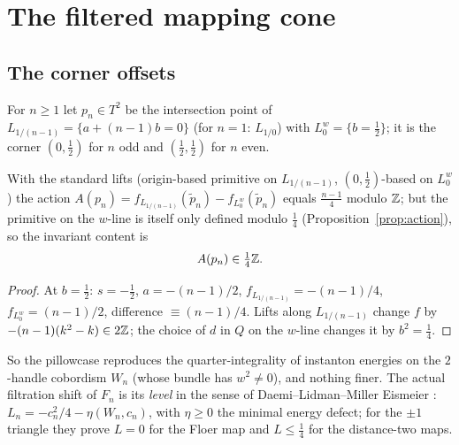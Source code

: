 \section{The filtered mapping cone}\label{sec:cone}
\subsection{The corner offsets}
For $n\ge1$ let $p_n\in T^2$ be the intersection point of $L_{1/(n-1)}=\{a+(n-1)b=0\}$ (for $n=1$: $L_{1/0}$) with
$L^w_0=\{b=\tfrac12\}$; it is the corner $(0,\tfrac12)$ for $n$ odd and $(\tfrac12,\tfrac12)$ for $n$ even.

\begin{lemma}\label{lem:corner}
With the standard lifts (origin-based primitive on $L_{1/(n-1)}$, $(0,\tfrac12)$-based on $L^w_0$) the action
$A(p_n)=f_{L_{1/(n-1)}}(\tilde p_n)-f_{L^w_0}(\tilde p_n)$ equals $\tfrac{n-1}{4}$ modulo $\mathbb{Z}$; but the primitive on the
$w$-line is itself only defined modulo $\tfrac14$ (Proposition~\ref{prop:action}), so the invariant content is
\[
A(p_n)\in\tfrac14\mathbb{Z} .
\]
\end{lemma}
\begin{proof}
At $b=\tfrac12$: $s=-\tfrac12$, $a=-(n-1)/2$, $f_{L_{1/(n-1)}}=-(n-1)/4$, $f_{L^w_0}=(n-1)/2$, difference
$\equiv(n-1)/4$.  Lifts along $L_{1/(n-1)}$ change $f$ by $-(n-1)(k^2-k)\in2\mathbb{Z}$; the choice of $d$ in $Q$ on the
$w$-line changes it by $b^2=\tfrac14$.
\end{proof}
So the pillowcase reproduces the quarter-integrality of instanton energies on the $2$-handle cobordism $W_n$
(whose bundle has $w^2\ne0$), and nothing finer.  The actual filtration shift of $F_n$ is its \emph{level} in the
sense of Daemi--Lidman--Miller Eismeier \cite{DLM}: $L_n=-c_n^2/4-\eta(W_n,c_n)$, with $\eta\ge0$ the minimal
energy defect; for the $\pm1$ triangle they prove $L=0$ for the Floer map and $L\le\tfrac14$ for the distance-two maps.

